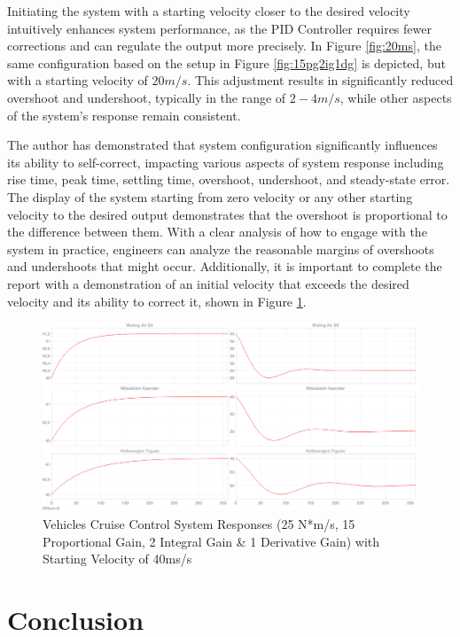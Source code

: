 \documentclass{article}
\begin{document}
Initiating the system with a starting velocity closer to the desired velocity intuitively enhances system performance, as the PID Controller requires fewer corrections and can regulate the output more precisely. In Figure \ref{fig:20ms}, the same configuration based on the setup in Figure \ref{fig:15pg2ig1dg} is depicted, but with a starting velocity of $20 m/s$. This adjustment results in significantly reduced overshoot and undershoot, typically in the range of $2 - 4 m/s$, while other aspects of the system's response remain consistent.

The author has demonstrated that system configuration significantly influences its ability to self-correct, impacting various aspects of system response including rise time, peak time, settling time, overshoot, undershoot, and steady-state error. The display of the system starting from zero velocity or any other starting velocity to the desired output demonstrates that the overshoot is proportional to the difference between them. With a clear analysis of how to engage with the system in practice, engineers can analyze the reasonable margins of overshoots and undershoots that might occur. Additionally, it is important to complete the report with a demonstration of an initial velocity that exceeds the desired velocity and its ability to correct it, shown in Figure \ref{fig:40ms}.

\begin{figure}[htbp]
    \centering
    \includegraphics[width=1\linewidth]{img/40ms.png}
    \caption{Vehicles Cruise Control System Responses (25 N*m/s, 15 Proportional Gain, 2 Integral Gain \& 1 Derivative Gain) with Starting Velocity of 40ms/s}
    \label{fig:40ms}
\end{figure}

\section{Conclusion}
\end{document}
